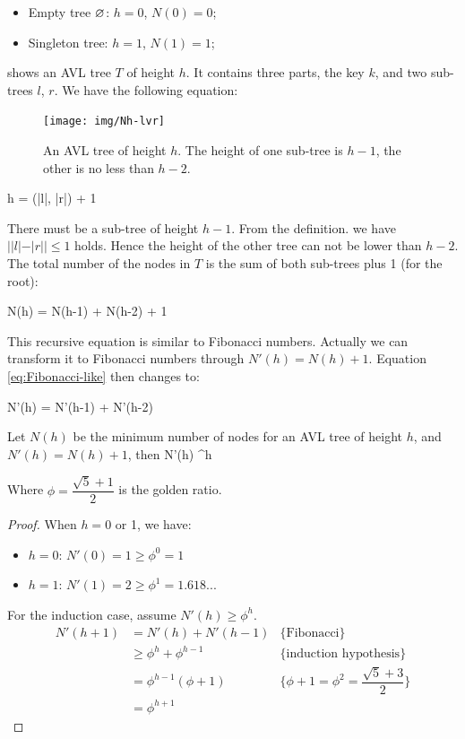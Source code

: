 \documentclass[b5paper]{article}
\begin{document}
\begin{itemize}
\item Empty tree $\varnothing$: $h = 0$, $N(0) = 0$;
\item Singleton tree: $h = 1$, $N(1) = 1$;
\end{itemize}

 shows an AVL tree $T$ of height $h$. It contains three parts, the key $k$, and two sub-trees $l$, $r$. We have the following equation:

\begin{figure}[htbp]
   \centering
   \texttt{[image: img/Nh-lvr]}
   \caption{An AVL tree of height $h$. The height of one sub-tree is $h-1$, the other is no less than $h-2$.}
   \label{fig:N-h-relation}
\end{figure}

\be
  h = \max(|l|, |r|) + 1
\ee

There must be a sub-tree of height $h - 1$. From the definition. we have $||l|-|r|| \leq 1$ holds. Hence the height of the other tree can not be lower than $h - 2$. The total number of the nodes in $T$ is the sum of both sub-trees plus 1 (for the root):

\be
  N(h) = N(h-1) + N(h-2) + 1
  \label{eq:Fibonacci-like}
\ee

This recursive equation is similar to Fibonacci numbers. Actually we can transform it to Fibonacci numbers through $N'(h) = N(h) + 1$. Equation \cref{eq:Fibonacci-like} then changes to:

\be
  N'(h) = N'(h-1) + N'(h-2)
\ee

\begin{lemma}
\label{lemma:N-phi}
Let $N(h)$ be the minimum number of nodes for an AVL tree of height $h$, and $N'(h) = N(h) + 1$, then
\be
  N'(h) \geq \phi^h
\ee

Where $\phi = \dfrac{\sqrt{5}+1}{2}$ is the golden ratio.
\end{lemma}

\begin{proof}
When $h = 0$ or 1, we have:
\begin{itemize}
\item $h = 0$: $N'(0) = 1 \geq \phi^0 = 1$
\item $h = 1$: $N'(1) = 2 \geq \phi^1 = 1.618...$
\end{itemize}

For the induction case, assume $N'(h) \geq \phi^h$.
\[
  \begin{array}{rll}
  N'(h+1) & = N'(h) + N'(h-1) & \{\text{Fibonacci}\} \\
          & \geq \phi^h + \phi^{h-1} & \{\text{induction hypothesis}\}\\
          & = \phi^{h-1}(\phi + 1) & \{\phi + 1 = \phi^2 = \dfrac{\sqrt{5}+3}{2}\} \\
          & = \phi^{h+1}
 \end{array}
\]
\end{proof}
\end{document}
